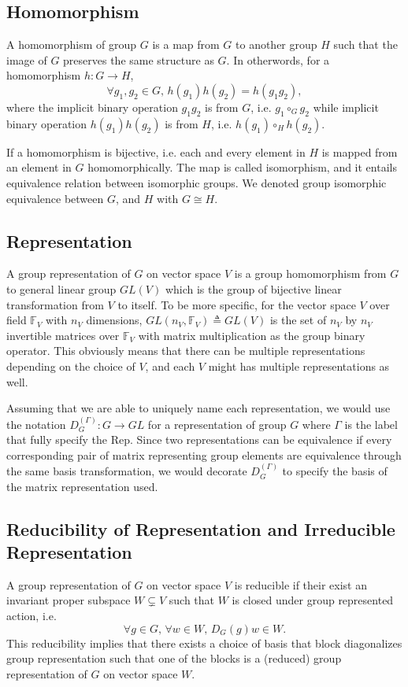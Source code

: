 \documentclass[preprint, 12pt]{revtex4-2}
\numberwithin{equation}{section}
\begin{document}
\subsection{Homomorphism}
A homomorphism of group $G$ is a map from $G$ to another group $H$ such that the image of $G$ preserves the same structure as $G$. In otherwords, for a homomorphism $h:G\rightarrow H$,
\begin{equation}\label{eq:homomorphism}
    \forall g_1, g_2\in G,\, h(g_1)h(g_2) = h(g_1g_2),
\end{equation}
where the implicit binary operation $g_1g_2$ is from $G$, i.e. $g_1\circ_G g_2$ while implicit binary operation $h(g_1)h(g_2)$ is from $H$, i.e. $h(g_1)\circ_H h(g_2)$.

If a homomorphism is bijective, i.e. each and every element in $H$ is mapped from an element in $G$ homomorphically. The map is called isomorphism, and it entails equivalence relation between isomorphic groups. We denoted group isomorphic equivalence between $G$, and $H$ with $G\cong H$. 

\subsection{Representation}
A group representation of $G$ on vector space $V$ is a group homomorphism from $G$ to general linear group $GL(V)$ which is the group of bijective linear transformation from $V$ to itself. To be more specific, for the vector space $V$ over field $\mathbb{F}_V$ with $n_V$ dimensions, $GL(n_V, \mathbb{F}_V)\triangleq GL(V)$ is the set of $n_V$ by $n_V$ invertible matrices over $\mathbb{F}_V$ with matrix multiplication as the group binary operator. This obviously means that there can be multiple representations depending on the choice of $V$, and each $V$ might has multiple representations as well. 

Assuming that we are able to uniquely name each representation, we would use the notation $D_{G}^{(\Gamma)}:G\rightarrow GL$ for a representation of group $G$ where $\Gamma$ is the label that fully specify the Rep. Since two representations can be equivalence if every corresponding pair of matrix representing group elements are equivalence through the same basis transformation, we would decorate $D_{G}^{(\Gamma)}$ to specify the basis of the matrix representation used.

\subsection{Reducibility of Representation and Irreducible Representation}
A group representation of $G$ on vector space $V$ is reducible if their exist an invariant proper subspace $W\subsetneq V$ such that $W$ is closed under group represented action, i.e.
\begin{equation}\label{eq:invariant subspace}
    \forall g\in G,\,\forall w\in W,\, D_{G}(g)w\in W.
\end{equation}
This reducibility implies that there exists a choice of basis that block diagonalizes group representation such that one of the blocks is a (reduced) group representation of $G$ on vector space $W$.
\end{document}
